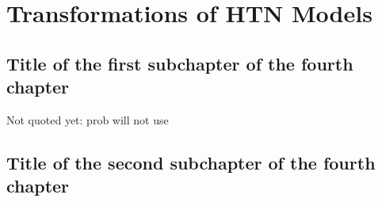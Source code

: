 \chapter{Transformations of {HTN} {M}odels}

\section{Title of the first subchapter of the fourth chapter}

Not quoted yet: \cite{inproceedings} prob will not use

\section{Title of the second subchapter of the fourth chapter}